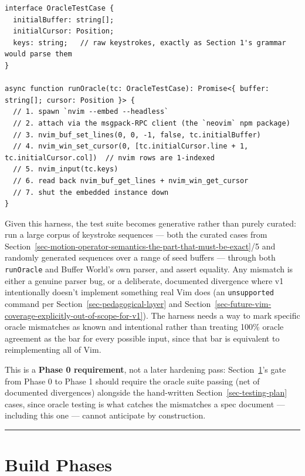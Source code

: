 \documentclass[11pt]{article}
\begin{document}
\begin{Verbatim}[breaklines=true, breakanywhere=true, fontsize=\small]
interface OracleTestCase {
  initialBuffer: string[];
  initialCursor: Position;
  keys: string;   // raw keystrokes, exactly as Section 1's grammar would parse them
}

async function runOracle(tc: OracleTestCase): Promise<{ buffer: string[]; cursor: Position }> {
  // 1. spawn `nvim --embed --headless`
  // 2. attach via the msgpack-RPC client (the `neovim` npm package)
  // 3. nvim_buf_set_lines(0, 0, -1, false, tc.initialBuffer)
  // 4. nvim_win_set_cursor(0, [tc.initialCursor.line + 1, tc.initialCursor.col])  // nvim rows are 1-indexed
  // 5. nvim_input(tc.keys)
  // 6. read back nvim_buf_get_lines + nvim_win_get_cursor
  // 7. shut the embedded instance down
}
\end{Verbatim}

Given this harness, the test suite becomes generative rather than purely
curated: run a large corpus of keystroke sequences --- both the curated cases
from Section~\ref{sec-motion-operator-semantics-the-part-that-must-be-exact}/5 and randomly generated sequences over a range of seed
buffers --- through both \texttt{runOracle} and Buffer World's own parser, and assert
equality. Any mismatch is either a genuine parser bug, or a deliberate,
documented divergence where v1 intentionally doesn't implement something
real Vim does (an \texttt{unsupported} command per Section~\ref{sec-pedagogical-layer} and Section~\ref{sec-future-vim-coverage-explicitly-out-of-scope-for-v1}). The
harness needs a way to mark specific oracle mismatches as known and
intentional rather than treating 100\% oracle agreement as the bar for every
possible input, since that bar is equivalent to reimplementing all of Vim.

This is a \textbf{Phase 0 requirement}, not a later hardening pass: Section~\ref{sec-build-phases}'s
gate from Phase 0 to Phase 1 should require the oracle suite passing (net of
documented divergences) alongside the hand-written Section~\ref{sec-testing-plan} cases, since
oracle testing is what catches the mismatches a spec document --- including
this one --- cannot anticipate by construction.

\begin{center}\rule{0.5\linewidth}{0.5pt}\end{center}

\hypertarget{sec-build-phases}{%
\section{Build Phases}\label{sec-build-phases}}
\end{document}
